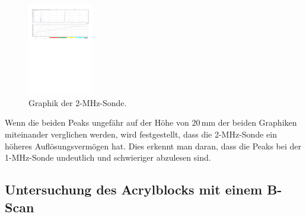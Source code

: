 \begin{figure}
    \centering
    \includegraphics[height = 4cm]{2Mhz.pdf}
    \caption{Graphik der 2-MHz-Sonde.}
    \label{fig:2son}
\end{figure}

Wenn die beiden Peaks ungefähr auf der Höhe von $20\,\unit{\mm}$ der beiden Graphiken miteinander verglichen werden, wird festgestellt, dass die 2-MHz-Sonde 
ein höheres Auflösungsvermögen hat. Dies erkennt man daran, dass die Peaks bei der 1-MHz-Sonde undeutlich und schwieriger abzulesen sind.

\subsection{Untersuchung des Acrylblocks mit einem B-Scan}